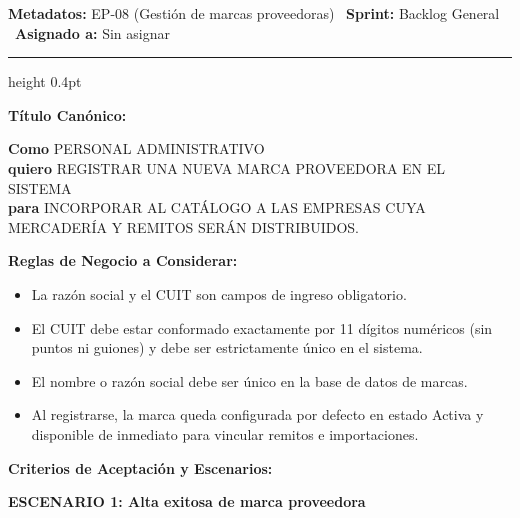 \documentclass[a4paper,9pt]{article}
\begin{document}
\begin{tcolorbox}[hucard, title={\textbf{HU-253: CONSULTAR MARCAS PROVEEDORAS} \hfill \scriptsize \colorbox{bluestatus}{\textbf{\ New\ }} \quad \colorbox{white}{\textcolor{primarydark}{\textbf{\ 0 pts\ }}}}]
\vspace{-1pt}
\noindent\textbf{\footnotesize Metadatos:} EP-08 (Gestión de marcas proveedoras) \textbar\ \textbf{Sprint:} Backlog General \textbar\ \textbf{Asignado a:} Sin asignar\par\vspace{2pt}
\hrule height 0.4pt\par\vspace{3pt}
\noindent\textbf{\footnotesize Título Canónico:}\par\vspace{1pt}
{\small \textbf{Como} PERSONAL ADMINISTRATIVO \\ \textbf{quiero} REGISTRAR UNA NUEVA MARCA PROVEEDORA EN EL SISTEMA \\ \textbf{para} INCORPORAR AL CATÁLOGO A LAS EMPRESAS CUYA MERCADERÍA Y REMITOS SERÁN DISTRIBUIDOS.}\par\vspace{3pt}
\noindent\textbf{\footnotesize Reglas de Negocio a Considerar:}\par\vspace{1pt}
{\footnotesize
\begin{itemize}[leftmargin=12pt, nosep, itemsep=1.5pt, topsep=1pt]
\item La razón social y el CUIT son campos de ingreso obligatorio.
\item El CUIT debe estar conformado exactamente por 11 dígitos numéricos (sin puntos ni guiones) y debe ser estrictamente único en el sistema.
\item El nombre o razón social debe ser único en la base de datos de marcas.
\item Al registrarse, la marca queda configurada por defecto en estado Activa y disponible de inmediato para vincular remitos e importaciones.
\end{itemize}
}\par\vspace{3pt}
\noindent\textbf{\footnotesize Criterios de Aceptación y Escenarios:}\par\vspace{2pt}
{\footnotesize
\noindent\textbf{\textcolor{secondarydark}{ESCENARIO 1:  Alta exitosa de marca proveedora}}\par\vspace{1pt}
}
\end{tcolorbox}
\end{document}
